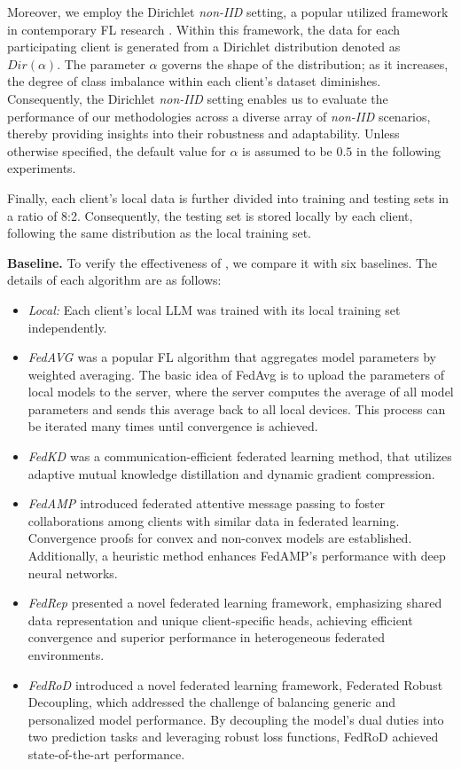 \documentclass[sigconf]{acmart}
\newcommand\our{\text{FDLoRA}}
\begin{document}
\par
Moreover, we employ the Dirichlet \textit{non-IID} setting, a popular utilized framework in contemporary FL research \cite{lin2020ensemble, ma2022layer}. Within this framework, the data for each participating client is generated from a Dirichlet distribution denoted as $Dir(\alpha)$. The parameter $\alpha$ governs the shape of the distribution; as it increases, the degree of class imbalance within each client's dataset diminishes. Consequently, the Dirichlet \textit{non-IID} setting enables us to evaluate the performance of our methodologies across a diverse array of \textit{non-IID} scenarios, thereby providing insights into their robustness and adaptability. Unless otherwise specified, the default value for $\alpha$ is assumed to be $0.5$ in the following experiments. 
\par
Finally, each client's local data is further divided into training and testing sets in a ratio of 8:2. Consequently, the testing set is stored locally by each client, following the same distribution as the local training set.
\par
\textbf{Baseline.} To verify the effectiveness of \our{}, we compare it with six baselines. The details of each algorithm are as follows:
\begin{itemize}
    \item \textit{Local:}  Each client’s local LLM was trained with its local training set independently.  
    \item \textit{FedAVG \cite{mcmahan2017communication}} was a popular FL algorithm that aggregates model parameters by weighted averaging. The basic idea of FedAvg is to upload the parameters of local models to the server, where the server computes the average of all model parameters and sends this average back to all local devices. This process can be iterated many times until convergence is achieved.
    \item \textit{FedKD \cite{wu2022communication}} was a communication-efficient federated learning method, that utilizes adaptive mutual knowledge distillation and dynamic gradient compression.
    \item \textit{FedAMP \cite{huang2021personalized}} introduced federated attentive message passing to foster collaborations among clients with similar data in federated learning. Convergence proofs for convex and non-convex models are established. Additionally, a heuristic method enhances FedAMP's performance with deep neural networks. 
    \item \textit{FedRep \cite{collins2021exploiting}} presented a novel federated learning framework, emphasizing shared data representation and unique client-specific heads, achieving efficient convergence and superior performance in heterogeneous federated environments.
    \item \textit{FedRoD \cite{chen2021bridging}} introduced a novel federated learning framework, Federated Robust Decoupling, which addressed the challenge of balancing generic and personalized model performance. By decoupling the model's dual duties into two prediction tasks and leveraging robust loss functions, FedRoD achieved state-of-the-art performance. 
\end{itemize}
\end{document}

